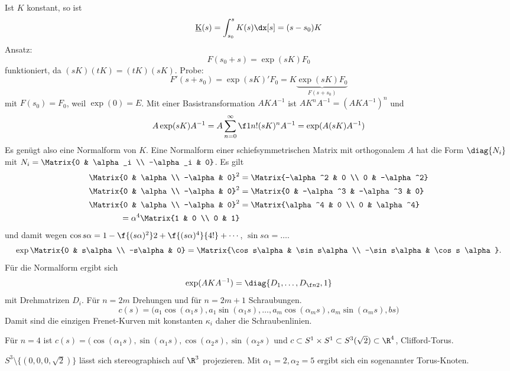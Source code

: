 Ist $K$ konstant, so ist
\[
	\v K(s) = \int_{s_0}^s K(s) \dx[s] = (s-s_0) K
\]
Ansatz:
\[
	F(s_0 + s) = \exp(sK) F_0
\]
funktioniert, da $(sK)(tK) = (tK)(sK)$.
Probe:
\[
	F'(s+s_0)
	= \exp(sK)' F_0
	=K \underbrace{\exp(sK) F_0}_{F(s+s_0)}
\]
mit $F(s_0) = F_0$, weil $\exp(0) = E$.
Mit einer Basistransformation $AKA^{-1}$ ist $AK^nA^{-1} = (AKA^{-1})^n$ und
\[
	A \exp(sK) A^{-1}
	= A \sum_{n=0}^\infty \f 1{n!} (sK)^n A^{-1}
	= \exp(A(sK)A^{-1})
\]
Es genügt also eine Normalform von $K$.
Eine Normalform einer schiefsymmetrischen Matrix mit orthogonalem $A$ hat die Form $\diag\{N_i\}$ mit $N_i = \Matrix{0 & \alpha_i \\ -\alpha_i & 0}$.
Es gilt
\begin{align*}
	\Matrix{0 & \alpha \\ -\alpha & 0}^2
			  &= \Matrix{-\alpha^2 & 0 \\ 0 & -\alpha^2} \\
	\Matrix{0 & \alpha \\ -\alpha & 0}^2
						  &= \Matrix{0 & -\alpha^3 & -\alpha^3 & 0} \\
	\Matrix{0 & \alpha \\ -\alpha & 0}^2
			  &= \Matrix{\alpha^4 & 0 \\ 0 & \alpha^4} \\
	= \alpha^4 \Matrix{1 & 0 \\ 0 & 1}
\end{align*}
und damit wegen $\cos s\alpha = 1 - \f{(s\alpha)^2}2 + \f{(s\alpha)^4}{4!} + \dotsb$, $\sin s\alpha = \dotsc$.
\[
	\exp \Matrix{0 & s\alpha \\ -s\alpha & 0}
	= \Matrix{\cos s\alpha & \sin s\alpha \\ -\sin s\alpha & \cos s \alpha}.
\]
Für die Normalform ergibt sich
\[
	\exp(AKA^{-1}) = \diag\{D_1, \dotsc, D_{\f n2}, 1\}
\]
mit Drehmatrizen $D_i$.
Für $n = 2m$ Drehungen und für $n = 2m + 1$ Schraubungen.
\[
	c(s)
	= \Big( a_1 \cos(\alpha_1 s), a_1 \sin(\alpha_1 s), \dotsc, a_m \cos (\alpha_m s), a_m \sin(\alpha_m s), bs \Big)
\]
Damit sind die einzigen Frenet-Kurven mit konstanten $\kappa_i$ daher die Schraubenlinien.

Für $n = 4$ ist $c(s) = (\cos (\alpha_1 s), \sin(\alpha_1 s), \cos (\alpha_2 s), \sin (\alpha_2 s)$
und $c \subset S^1 \times S^1 \subset S^3(\sqrt{2}) \subset \R^4$, Clifford-Torus.

$S^3 \setminus \{ (0,0,0, \sqrt 2) \}$ lässt sich stereographisch auf $\R^3$ projezieren.
Mit $\alpha_1 = 2, \alpha_2 = 5$ ergibt sich ein sogenannter Torus-Knoten.

